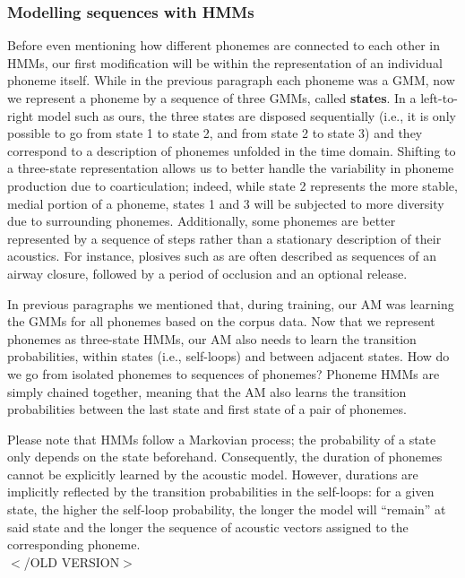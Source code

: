 {\subsubsection{Modelling sequences with HMMs}
Before even mentioning how different phonemes are connected to each other in HMMs, our first modification will be within the representation of an individual phoneme itself. While in the previous paragraph each phoneme was a GMM, now we represent a phoneme by a sequence of three GMMs, called \textbf{states}. In a left-to-right model such as ours, the three states are disposed sequentially (i.e., it is only possible to go from state 1 to state 2, and from state 2 to state 3) and they correspond to a description of phonemes unfolded in the time domain. Shifting to a three-state representation allows us to better handle the variability in phoneme production due to coarticulation; indeed, while state 2 represents the more stable, medial portion of a phoneme, states 1 and 3 will be subjected to more diversity due to surrounding phonemes. Additionally, some phonemes are better represented by a sequence of steps rather than a stationary description of their acoustics. For instance, plosives such as  are often described as sequences of an airway closure, followed by a period of occlusion and an optional release.

In previous paragraphs we mentioned that, during training, our AM was learning the GMMs for all phonemes based on the corpus data. Now that we represent phonemes as three-state HMMs, our AM also needs to learn the transition probabilities, within states (i.e., self-loops) and between adjacent states. How do we go from isolated phonemes to sequences of phonemes? Phoneme HMMs are simply chained together, meaning that the AM also learns the transition probabilities between the last state and first state of a pair of phonemes.

Please note that HMMs follow a Markovian process; the probability of a state only depends on the state beforehand. Consequently, the duration of phonemes cannot be explicitly learned by the acoustic model. However, durations are implicitly reflected by the transition probabilities in the self-loops: for a given state, the higher the self-loop probability, the longer the model will ``remain'' at said state and the longer the sequence of acoustic vectors assigned to the corresponding phoneme.  \\
$<$/OLD VERSION$>$}

